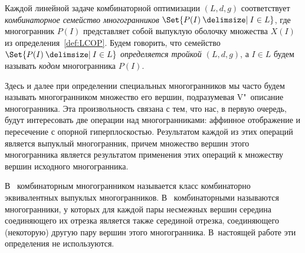 \begin{definition}\label{def:family}
	Каждой линейной задаче комбинаторной оптимизации $(L, d, g)$ %
	соответствует \emph{комбинаторное семейство многогранников} $\Set{P(I)\given I\in L}$, где многогранник $P(I)$ представляет собой выпуклую оболочку множества $X(I)$ из определения~\ref{def:LCOP}.
	Будем говорить, что семейство $\Set{P(I)\given I\in L}$ \emph{определяется тройкой $(L, d, g)$}, а $I \in L$ будем называть \emph{кодом} многогранника $P(I)$.
\end{definition}

\begin{remark}
Здесь и далее при определении специальных многогранников мы часто будем называть многогранником множество его вершин, подразумевая V"~описание многогранника.
Эта произвольность связана с тем, что нас, в первую очередь, будут интересовать две операции над многогранниками: аффинное отображение и пересечение с опорной гиперплоскостью. Результатом каждой из этих операций является выпуклый многогранник, причем множество вершин этого многогранника является результатом применения этих операций к множеству вершин исходного многогранника.
\end{remark}

\begin{comment}
\begin{remark}
Выбор пространства $\{0,1,\dots,k\}^d$ вместо более общего $\{a,a+1,\dots,b\}^d$, $a,b\in\Z$, объясняется тем, что любое множество $X \subseteq \{a,a+1,\dots,b\}^d$ элементарным смещением $\bm{x} \mapsto \bm{x} - \bm{a}$ преобразуется в множество $X' \subseteq \{0, k\}^d$, где $k = b-a$.
При этом не меняются не только комбинаторно"=геометрические свойства этого множества, но и сложность задачи линейной оптимизации на нем.
(Предполагается, что $a$ и $b$, также, как и $k$ в определении~\ref{def:family}, полиномиально вычислимы относительно кода многогранника.)
\end{remark}
\end{comment}
\begin{remark} 
В~\cite[с.~420]{ZieglerBook} комбинаторным многогранником называется класс комбинаторно эквивалентных выпуклых многогранников.
В~\cite{Naddef:1981, MatsuiTamura:1995} комбинаторными называются многогранники, у которых для каждой пары несмежных вершин середина соединяющего их отрезка является также серединой отрезка, соединяющего (некоторую) другую пару вершин этого многогранника.
В~настоящей работе эти определения не используются.
\end{remark}

